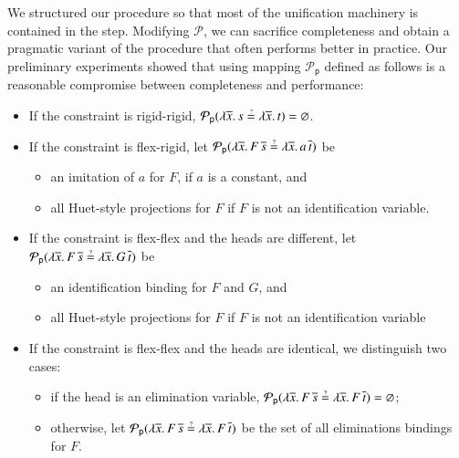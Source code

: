  We structured our procedure so that most of
the unification machinery is contained in the  step. Modifying
$\mathcal{P}$, we can sacrifice completeness and obtain a pragmatic variant of
the procedure that often performs better in practice. 
Our preliminary experiments showed that using mapping $\mathcal{P}_\mathsf{p}$ defined as follows is a reasonable compromise between completeness and
performance:
\begin{itemize}
    \setlength\itemsep{1\jot}
    \item If the constraint is rigid-rigid, $\mathcal{P}_\mathsf{p}(\lambda \overline{x}.
    \, s \unif \lambda \overline{x}. \, t) = \varnothing$.
    \item If the constraint is flex-rigid,
    let 
    $\mathcal{P}_\mathsf{p}(\lambda \overline{x}. \, F \,\overline{s} \unif \lambda \overline{x}. \, a\, \overline{t})$ 
    be 
    \begin{itemize}
        \item an imitation of $a$ for $F$, if $a$ is a constant, and
        \item all Huet-style projections for $F$ if $F$ is not an identification variable.
    \end{itemize}
    
    \item If the constraint is flex-flex and the heads are different,
    let 
    $\mathcal{P}_\mathsf{p}(\lambda \overline{x}. \, F \,\overline{s} \unif \lambda \overline{x}. \, G\, \overline{t})$ 
    be
    \begin{itemize}
      \item an identification binding for $F$ and $G$, and
      \item all Huet-style projections for $F$ if $F$ is not an identification variable
  \end{itemize}
   
  \item If the constraint is flex-flex and the heads are identical, we distinguish two cases:
      \begin{itemize}
      \item if the head is an elimination variable, 
      $\mathcal{P}_\mathsf{p}(\lambda \overline{x}. \, F \,\overline{s} \unif \lambda \overline{x}. \, F\, \overline{t}) = \varnothing$;
      \item otherwise, let $\mathcal{P}_\mathsf{p}(\lambda \overline{x}. \, F \,\overline{s} \unif \lambda \overline{x}. \, F\, \overline{t})$
            be the set of all eliminations bindings for $F$. 
  \end{itemize}
\end{itemize}

